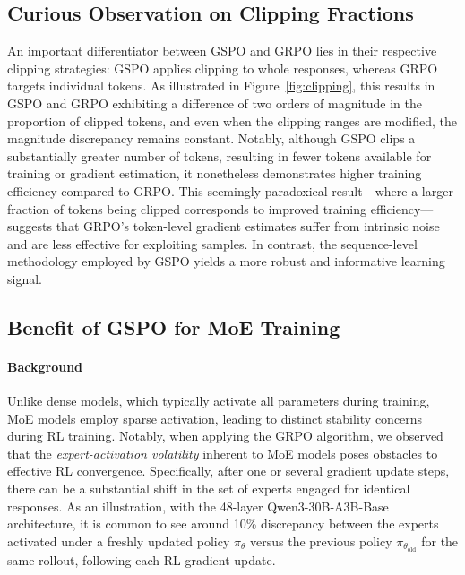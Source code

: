 \subsection{Curious Observation on Clipping Fractions}

An important differentiator between GSPO and GRPO lies in their respective clipping strategies: GSPO applies clipping to whole responses, whereas GRPO targets individual tokens. As illustrated in Figure~\ref{fig:clipping}, this results in GSPO and GRPO exhibiting a difference of two orders of magnitude in the proportion of clipped tokens, and even when the clipping ranges are modified, the magnitude discrepancy remains constant. Notably, although GSPO clips a substantially greater number of tokens, resulting in fewer tokens available for training or gradient estimation, it nonetheless demonstrates higher training efficiency compared to GRPO. This seemingly paradoxical result—where a larger fraction of tokens being clipped corresponds to improved training efficiency—suggests that GRPO's token-level gradient estimates suffer from intrinsic noise and are less effective for exploiting samples. In contrast, the sequence-level methodology employed by GSPO yields a more robust and informative learning signal.

\subsection{Benefit of GSPO for MoE Training}
\label{subsec:routing_replay}

\paragraph{Background}
Unlike dense models, which typically activate all parameters during training, MoE models employ sparse activation, leading to distinct stability concerns during RL training. Notably, when applying the GRPO algorithm, we observed that the \textit{expert-activation volatility} inherent to MoE models poses obstacles to effective RL convergence. Specifically, after one or several gradient update steps, there can be a substantial shift in the set of experts engaged for identical responses. As an illustration, with the 48-layer Qwen3-30B-A3B-Base architecture, it is common to see around 10\% discrepancy between the experts activated under a freshly updated policy $\pi_{\theta}$ versus the previous policy $\pi_{\theta_\text{old}}$ for the same rollout, following each RL gradient update. 

